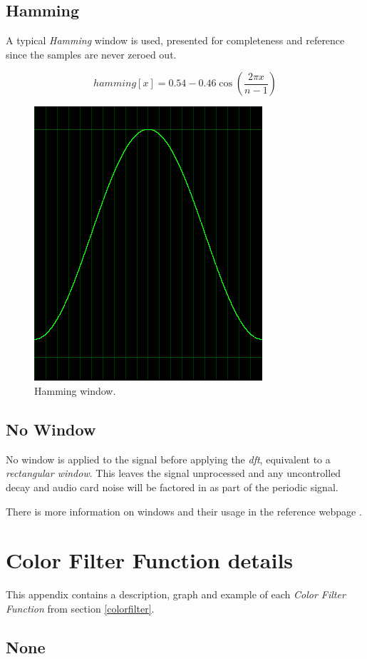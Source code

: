 \documentclass[10pt,a4paper]{report}
\newcommand{\ac}[1]{\textit{\acrshort{#1}}}
\begin{document}
\begin{appendices}
\section{Hamming}
A typical \textit{Hamming} window is used, presented for completeness and reference since the samples are never zeroed out.

\begin{equation}
hamming[x] = 0.54 - 0.46\cos(\frac{2\pi x}{n-1})
\end{equation}

\begin{figure}[H]
	\centering
	\includegraphics[width=0.4\linewidth]{images/windows/window-hamming.png}
	\caption[Hamming window]{Hamming window.}
	\label{fig:window-hamming}
\end{figure}

\section{No Window}

No window is applied to the signal before applying the \ac{dft}, equivalent to a \textit{rectangular window}. This leaves the signal unprocessed and any uncontrolled decay and audio card noise will be factored in as part of the periodic signal.

There is more information on windows and their usage in the reference webpage \cite{windowtypes}.

\chapter{Color Filter Function details}
\label{filterfunctions}

This appendix contains a description, graph and example of each \textit{Color Filter Function} from section \ref{colorfilter}.

\section{None} 


\end{appendices}
\end{document}
